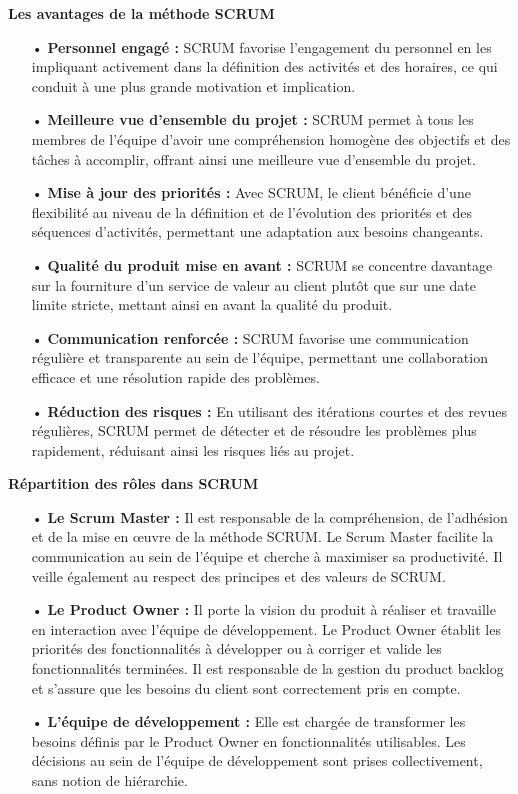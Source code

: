 \textbf{\large{Les avantages de la méthode SCRUM}}
\medskip
\begin{itemize}
    \item[•] \textbf{Personnel engagé :} SCRUM favorise l'engagement du personnel en les impliquant activement dans la définition des activités et des horaires, ce qui conduit à une plus grande motivation et implication.
    \item[•] \textbf{Meilleure vue d’ensemble du projet :} SCRUM permet à tous les membres de l'équipe d'avoir une compréhension homogène des objectifs et des tâches à accomplir, offrant ainsi une meilleure vue d'ensemble du projet.
    \item[•] \textbf{Mise à jour des priorités :} Avec SCRUM, le client bénéficie d'une flexibilité au niveau de la définition et de l'évolution des priorités et des séquences d'activités, permettant une adaptation aux besoins changeants.
    \item[•] \textbf{Qualité du produit mise en avant :} SCRUM se concentre davantage sur la fourniture d'un service de valeur au client plutôt que sur une date limite stricte, mettant ainsi en avant la qualité du produit.
    \item[•] \textbf{Communication renforcée :} SCRUM favorise une communication régulière et transparente au sein de l'équipe, permettant une collaboration efficace et une résolution rapide des problèmes.
    \item[•] \textbf{Réduction des risques :} En utilisant des itérations courtes et des revues régulières, SCRUM permet de détecter et de résoudre les problèmes plus rapidement, réduisant ainsi les risques liés au projet.\\
\end{itemize}


\textbf{\large{Répartition des rôles dans SCRUM}}
\medskip
\begin{itemize}
    \item[•] \textbf{Le Scrum Master :} Il est responsable de la compréhension, de l'adhésion et de la mise en œuvre de la méthode SCRUM. Le Scrum Master facilite la communication au sein de l'équipe et cherche à maximiser sa productivité. Il veille également au respect des principes et des valeurs de SCRUM.
    \item[•] \textbf{Le Product Owner :} Il porte la vision du produit à réaliser et travaille en interaction avec l'équipe de développement. Le Product Owner établit les priorités des fonctionnalités à développer ou à corriger et valide les fonctionnalités terminées. Il est responsable de la gestion du product backlog et s'assure que les besoins du client sont correctement pris en compte.
    \item[•] \textbf{L'équipe de développement :} Elle est chargée de transformer les besoins définis par le Product Owner en fonctionnalités utilisables. Les décisions au sein de l'équipe de développement sont prises collectivement, sans notion de hiérarchie.\\
\end{itemize}


